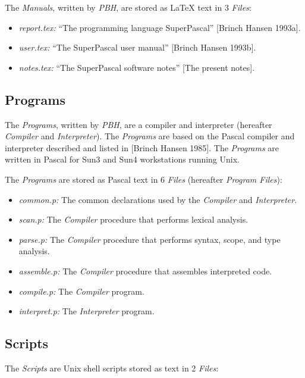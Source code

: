 The {\it Manuals}, written by {\it PBH}, are stored as {\LaTeX}
text in 3 {\it Files}:

\begin{itemize}
  \item
  {\it report.tex:} ``The programming language SuperPascal''
  [Brinch Hansen 1993a].
  \item
  {\it user.tex:} ``The SuperPascal user manual'' [Brinch
  Hansen 1993b].
  \item
  {\it notes.tex:} ``The SuperPascal software notes'' [The
  present notes].
\end{itemize}


\subsection{Programs}

The {\it Programs}, written by {\it PBH}, are a {\Superpascal}
compiler and interpreter (hereafter {\it Compiler} and {\it
Interpreter}). The {\it Programs} are based on the Pascal
compiler and interpreter described and listed in [Brinch
Hansen 1985]. The {\it Programs} are written in Pascal for
Sun3 and Sun4 workstations running Unix.

The {\it Programs} are stored as Pascal text in 6 {\it Files}
(hereafter {\it Program Files}):

\begin{itemize}
  \item
  {\it common.p:} The common declarations used by the
  {\it Compiler} and {\it Interpreter}.
  \item
  {\it scan.p:} The {\it Compiler} procedure that performs
  lexical analysis.
  \item
  {\it parse.p:} The {\it Compiler} procedure that performs
  syntax, scope, and type analysis.
  \item
  {\it assemble.p:} The {\it Compiler} procedure that
  assembles interpreted code.
  \item
  {\it compile.p:} The {\it Compiler} program.
  \item
  {\it interpret.p:} The {\it Interpreter} program.
\end{itemize}


\subsection{Scripts}

The {\it Scripts} are Unix shell scripts stored as text in 2
{\it Files}:

